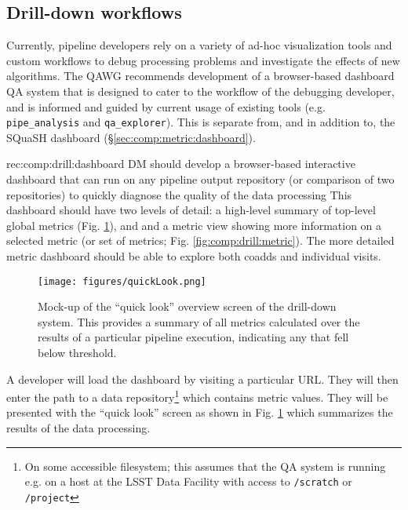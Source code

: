 \subsection{Drill-down workflows}
\label{sec:comp:drill}

Currently, pipeline developers rely on a variety of ad-hoc visualization tools and custom workflows to debug processing problems and investigate the effects of new algorithms.
The QAWG recommends development of a browser-based dashboard QA system that is designed to cater to the workflow of the debugging developer, and is informed and guided by current usage of existing tools (e.g. \texttt{pipe\_analysis} and \texttt{qa\_explorer}).
This is separate from, and in addition to, the SQuaSH dashboard (\S \ref{sec:comp:metric:dashboard}).

\begin{recommendation}
  {rec:comp:drill:dashboard}
  {DM should develop a browser-based interactive dashboard that can run on any pipeline output repository (or comparison of two repositories) to quickly diagnose the quality of the data processing}
  This dashboard should have two levels of detail: a high-level summary of top-level global metrics (Fig. \ref{fig:comp:drill:quick}), and and a metric view showing more information on a selected metric (or set of metrics; Fig. \ref{fig:comp:drill:metric}).
  The more detailed metric dashboard should be able to explore both coadds and individual visits.
\end{recommendation}

\begin{figure}
  \begin{center}
    \texttt{[image: figures/quickLook.png]}
  \end{center}
  \caption{
    Mock-up of the ``quick look'' overview screen of the drill-down system.
    This provides a summary of all metrics calculated over the results of a particular pipeline execution, indicating any that fell below threshold.
  }
  \label{fig:comp:drill:quick}
\end{figure}

A developer will load the dashboard by visiting a particular URL.
They will then enter the path to a data repository\footnote{On some accessible filesystem; this assumes that the QA system is running e.g. on a host at the LSST Data Facility with access to \texttt{/scratch} or \texttt{/project}} which contains metric values.
They will be presented with the ``quick look'' screen as shown in Fig. \ref{fig:comp:drill:quick} which summarizes the results of the data processing.


